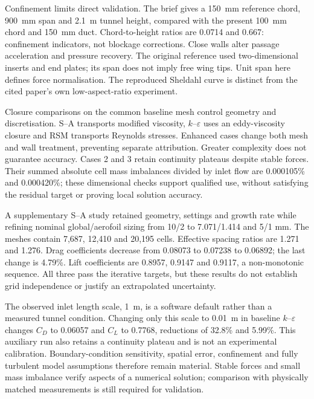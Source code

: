 \documentclass[conf]{new-aiaa}
\newcommand{\caseKE}{\ensuremath{k\!\text{--}\!\varepsilon}}
\begin{document}
Confinement limits direct validation. The brief gives a \SI{150}{\milli\metre} reference chord, \SI{900}{\milli\metre} span and \SI{2.1}{\metre} tunnel height, compared with the present \SI{100}{\milli\metre} chord and \SI{150}{\milli\metre} duct. Chord-to-height ratios are 0.0714 and 0.667: confinement indicators, not blockage corrections. Close walls alter passage acceleration and pressure recovery. The original reference used two-dimensional inserts and end plates\cite{sheldahl}; its span does not imply free wing tips. Unit span here defines force normalisation. The reproduced Sheldahl curve is distinct from the cited paper's own low-aspect-ratio experiment.

Closure comparisons on the common baseline mesh control geometry and discretisation. S--A transports modified viscosity, \caseKE{} uses an eddy-viscosity closure and RSM transports Reynolds stresses. Enhanced cases change both mesh and wall treatment, preventing separate attribution. Greater complexity does not guarantee accuracy. Cases 2 and 3 retain continuity plateaus despite stable forces. Their summed absolute cell mass imbalances divided by inlet flow are 0.000105\% and 0.000420\%; these dimensional checks support qualified use, without satisfying the residual target or proving local solution accuracy.

A supplementary S--A study retained geometry, settings and growth rate while refining nominal global/aerofoil sizing from 10/2 to 7.071/1.414 and 5/1 mm. The meshes contain 7,687, 12,410 and 20,195 cells. Effective spacing ratios are 1.271 and 1.276. Drag coefficients decrease from 0.08073 to 0.07238 to 0.06892; the last change is 4.79\%. Lift coefficients are 0.8957, 0.9147 and 0.9117, a non-monotonic sequence. All three pass the iterative targets, but these results do not establish grid independence or justify an extrapolated uncertainty.

The observed inlet length scale, \SI{1}{\metre}, is a software default rather than a measured tunnel condition. Changing only this scale to \SI{0.01}{\metre} in baseline \caseKE{} changes $C_D$ to 0.06057 and $C_L$ to 0.7768, reductions of 32.8\% and 5.99\%. This auxiliary run also retains a continuity plateau and is not an experimental calibration. Boundary-condition sensitivity, spatial error, confinement and fully turbulent model assumptions therefore remain material. Stable forces and small mass imbalance verify aspects of a numerical solution; comparison with physically matched measurements is still required for validation.
\end{document}
